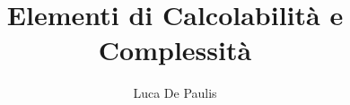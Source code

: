 \documentclass[
    oneside,
    10pt,
    language=italian,
    pagestyle=notes,
    fontstyle=palaeuler,
    thmstyle=boxed,
    colors
]{modernth}
\begin{document}
\author{Luca De Paulis}
\title{Elementi di Calcolabilità e Complessità}
\maketitle

\frontmatter{}
\tableofcontents

\mainmatter{}



\appendix

\end{document}
